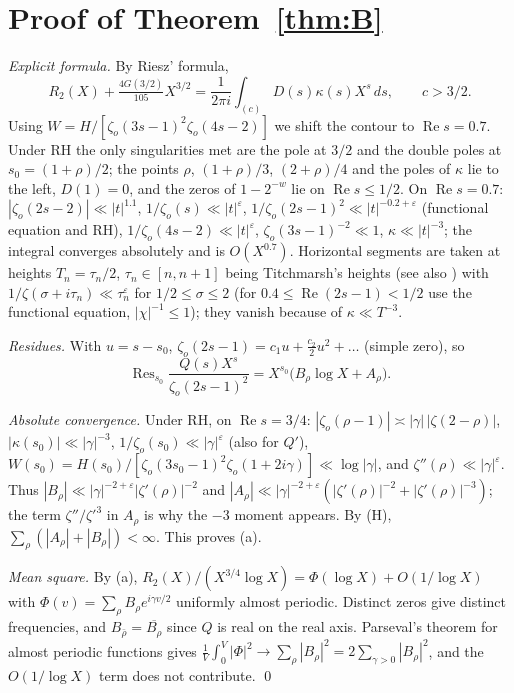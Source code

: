 \documentclass[11pt]{amsart}
\theoremstyle{remark}
\newcommand{\zo}{\zeta_{o}}
\DeclareMathOperator{\Res}{Res}
\begin{document}
\section{Proof of Theorem~\ref{thm:B}}\label{sec:B}

\emph{Explicit formula.} By Riesz' formula,
\[
R_2(X)+\tfrac{4G(3/2)}{105}X^{3/2}=\frac1{2\pi i}\int_{(c)}D(s)\kappa(s)X^s\,ds,\qquad c>3/2.
\]
Using $W=H/[\zo(3s-1)^2\zo(4s-2)]$ we shift the contour to $\operatorname{Re}s=0.7$. Under RH the only singularities met are the pole at $3/2$ and the double poles at $s_0=(1+\rho)/2$; the points $\rho$, $(1+\rho)/3$, $(2+\rho)/4$ and the poles of $\kappa$ lie to the left, $D(1)=0$, and the zeros of $1-2^{-w}$ lie on $\operatorname{Re}s\le1/2$. On $\operatorname{Re}s=0.7$: $|\zo(2s-2)|\ll|t|^{1.1}$, $1/\zo(s)\ll|t|^\varepsilon$, $1/\zo(2s-1)^2\ll|t|^{-0.2+\varepsilon}$ (functional equation and RH), $1/\zo(4s-2)\ll|t|^\varepsilon$, $\zo(3s-1)^{-2}\ll1$, $\kappa\ll|t|^{-3}$; the integral converges absolutely and is $O(X^{0.7})$. Horizontal segments are taken at heights $T_n=\tau_n/2$, $\tau_n\in[n,n+1]$ being Titchmarsh's heights \cite[Thm.~14.16]{T} (see also \cite[Lemma~3]{Ng}) with $1/\zeta(\sigma+i\tau_n)\ll\tau_n^\varepsilon$ for $1/2\le\sigma\le2$ (for $0.4\le\operatorname{Re}(2s-1)<1/2$ use the functional equation, $|\chi|^{-1}\le1$); they vanish because of $\kappa\ll T^{-3}$.

\emph{Residues.} With $u=s-s_0$, $\zo(2s-1)=c_1u+\tfrac{c_2}{2}u^2+\dots$ (simple zero), so
\[
\Res_{s_0}\frac{Q(s)X^s}{\zo(2s-1)^2}=X^{s_0}\big(B_\rho\log X+A_\rho\big).
\]

\emph{Absolute convergence.} Under RH, on $\operatorname{Re}s=3/4$: $|\zo(\rho-1)|\asymp|\gamma|\,|\zeta(2-\rho)|$, $|\kappa(s_0)|\ll|\gamma|^{-3}$, $1/\zo(s_0)\ll|\gamma|^\varepsilon$ (also for $Q'$), $W(s_0)=H(s_0)/[\zo(3s_0-1)^2\zo(1+2i\gamma)]\ll\log|\gamma|$, and $\zeta''(\rho)\ll|\gamma|^\varepsilon$. Thus $|B_\rho|\ll|\gamma|^{-2+\varepsilon}|\zeta'(\rho)|^{-2}$ and $|A_\rho|\ll|\gamma|^{-2+\varepsilon}(|\zeta'(\rho)|^{-2}+|\zeta'(\rho)|^{-3})$; the term $\zeta''/\zeta'^3$ in $A_\rho$ is why the $-3$ moment appears. By (H), $\sum_\rho(|A_\rho|+|B_\rho|)<\infty$. This proves (a).

\emph{Mean square.} By (a), $R_2(X)/(X^{3/4}\log X)=\Phi(\log X)+O(1/\log X)$ with $\Phi(v)=\sum_\rho B_\rho e^{i\gamma v/2}$ uniformly almost periodic. Distinct zeros give distinct frequencies, and $B_{\bar\rho}=\overline{B_\rho}$ since $Q$ is real on the real axis. Parseval's theorem for almost periodic functions gives $\frac1V\int_0^V|\Phi|^2\to\sum_\rho|B_\rho|^2=2\sum_{\gamma>0}|B_\rho|^2$, and the $O(1/\log X)$ term does not contribute. \qed
\end{document}
